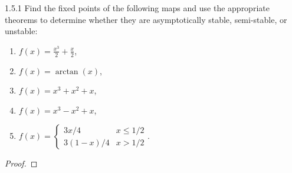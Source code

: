 \begin{problem}{1.5.1}
  Find the fixed points of the following maps and use the appropriate theorems
  to determine whether they are asymptotically stable, semi-stable, or unstable:
  \begin{enumerate}
    \item $f(x) = \frac{x^3}{2} + \frac{x}{2}$,
    \item $f(x) = \arctan(x)$,
    \item $f(x) = x^3 + x^2 + x $,
    \item $f(x) = x^3 - x^2 + x$,
    \item $f(x) = \begin{cases}3x/4 & x \leq 1/2 \\ 3(1-x)/4 & x > 1/2\end{cases}$.
  \end{enumerate}
\end{problem}

\begin{proof}
\end{proof}
\newpage
